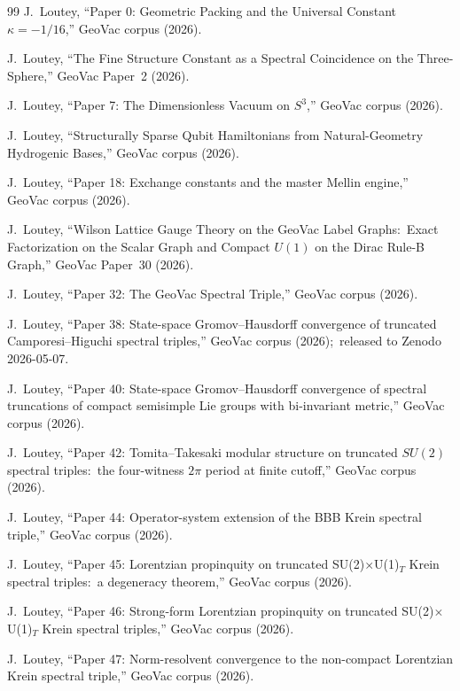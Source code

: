 \documentclass[11pt,a4paper]{article}
\newcommand{\sthree}{S^{3}}
\begin{document}
\begin{thebibliography}{99}
J.~Loutey, ``Paper 0: Geometric Packing and the Universal Constant
$\kappa = -1/16$,'' GeoVac corpus (2026).

J.~Loutey, ``The Fine Structure Constant as a Spectral Coincidence on
the Three-Sphere,'' GeoVac Paper~2 (2026).

J.~Loutey, ``Paper 7: The Dimensionless Vacuum on $\sthree$,''
GeoVac corpus (2026).

J.~Loutey, ``Structurally Sparse Qubit Hamiltonians from Natural-Geometry
Hydrogenic Bases,'' GeoVac corpus (2026).

J.~Loutey, ``Paper 18: Exchange constants and the master Mellin
engine,'' GeoVac corpus (2026).

J.~Loutey, ``Wilson Lattice Gauge Theory on the GeoVac Label Graphs:\
Exact Factorization on the Scalar Graph and Compact $U(1)$ on the Dirac
Rule-B Graph,'' GeoVac Paper~30 (2026).

J.~Loutey, ``Paper 32: The GeoVac Spectral Triple,''
GeoVac corpus (2026).

J.~Loutey, ``Paper 38: State-space Gromov--Hausdorff convergence of truncated
Camporesi--Higuchi spectral triples,'' GeoVac corpus (2026);\
released to Zenodo 2026-05-07.

J.~Loutey, ``Paper 40: State-space Gromov--Hausdorff convergence of
spectral truncations of compact semisimple Lie groups with bi-invariant metric,''
GeoVac corpus (2026).

J.~Loutey, ``Paper 42: Tomita--Takesaki modular structure on truncated
$SU(2)$ spectral triples:\ the four-witness $2\pi$ period at finite
cutoff,'' GeoVac corpus (2026).

J.~Loutey, ``Paper 44: Operator-system extension of the BBB Krein
spectral triple,'' GeoVac corpus (2026).

J.~Loutey, ``Paper 45: Lorentzian propinquity on truncated
SU(2)$\times$U(1)$_T$ Krein spectral triples:\ a degeneracy
theorem,'' GeoVac corpus (2026).

J.~Loutey, ``Paper 46: Strong-form Lorentzian propinquity on truncated
SU(2)$\times$U(1)$_T$ Krein spectral triples,'' GeoVac corpus (2026).

\bibitem{loutey_paper47}
J.~Loutey, ``Paper 47: Norm-resolvent convergence to the non-compact
Lorentzian Krein spectral triple,'' GeoVac corpus (2026).


\end{thebibliography}
\end{document}
